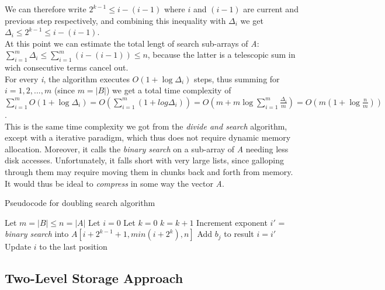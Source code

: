 We can therefore write $2^{k-1} \leq i-(i-1)$ where $i$ and $(i-1)$ are current and previous step respectively, and combining this inequality with $\Delta_i$ we get $\Delta_i \leq 2^{k-1} \leq i-(i-1)$. \\
At this point we can estimate the total lengt of search sub-arrays of \textit{A}: $\sum_{i=1}^{m} \Delta_i \leq \sum_{i=1}^{m} (i-(i-1)) \leq n$, because the latter is a telescopic sum in wich consecutive terms cancel out.\\
For every \textit{i}, the algorithm executes $O\left(1+ \log \Delta_i\right)$ steps, thus summing for $i = 1,2,...,m$ (since $m=|B|$) we get a total time complexity of $\sum_{i=1}^m O\left(1+ \log \Delta_i\right)=O\left(\sum_{i=1}^{m}\left(1+log \Delta_i\right)\right)=O\left(m+m \log \sum_{i=1}^m \frac{\Delta_i}{m}\right)=O\left(m\left(1+ \log \frac{n}{m}\right)\right)$.\\
This is the same time complexity we got from the \textit{divide and search}  algorithm, except with a iterative paradigm, which thus does not require dynamic memory allocation. Moreover, it calls the \textit{binary search}  on a sub-array of \textit{A} needing less disk accesses. Unfortunately, it falls short with very large lists, since galloping through them may require moving them in chunks back and forth from memory. It would thus be ideal to \textit{compress} in some way the vector \textit{A}.\\

\begin{algorithm}
    \captionsetup{labelsep=newline}
    \caption{Pseudocode for doubling search algorithm \label{alg:galloping}}
    \begin{algorithmic}[1]
        \State Let $m=|B| \leq n=|A|$
        \State Let $i=0$
            \State Let $k=0$
                \State $k=k+1$ \Comment Increment exponent
            \EndWhile
            \State $i'$ = \textit{binary search} into $A\left[i+2^{k-1}+1, min\left(i+2^k\right),n\right]$
                \State Add $b_j$ to result
            \EndIf
            \State $i=i'$ \Comment Update $i$ to the last position
        \EndFor
    \end{algorithmic}
\end{algorithm}

\subsection{Two-Level Storage Approach}

